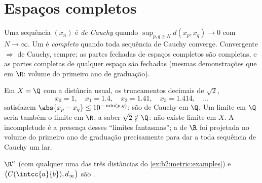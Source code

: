 \section{Espaços completos}

\begin{definition}\label{def:b2:metric:complete}
Uma sequência $(x_n)$ é \emph{de Cauchy} quando $\sup_{p, q \geq N} d(x_p,
x_q) \to 0$ com $N \to \infty$. Um  é
\emph{completo} quando toda sequência de Cauchy
converge. Convergente $\Rightarrow$ de Cauchy, sempre; as partes fechadas
de espaços completos são completas, e as partes completas de qualquer
espaço são fechadas (mesmas demonstrações que em $\R$: volume do primeiro ano de graduação).
\end{definition}

\begin{example}\label{ex:b2:metric:cauchynolimit}
Em $X = \Q$ com a distância usual, os truncamentos decimais de
$\sqrt2$,
\[
x_0 = 1,\quad x_1 = 1.4,\quad x_2 = 1.41,\quad x_3 = 1.414,
\quad\dots
\]
satisfazem $\abs{x_p - x_q} \leq 10^{-\min(p,q)}$: são de Cauchy em $\Q$.
Um limite em $\Q$ seria também o limite em $\R$, a saber
$\sqrt2 \notin \Q$: não existe limite em $X$. A incompletude é
a presença desses ``limites fantasmas''; a  de $\R$
foi projetada no volume do primeiro ano de graduação precisamente para dar a toda
sequência de Cauchy um lar.
\end{example}

\begin{theorem}\label{thm:b2:metric:rncomplete}
$\R^n$ (com qualquer uma das três distâncias do
\cref{ex:b2:metric:examples}) e $\bigl(C(\intcc{a}{b}),
d_\infty\bigr)$ são .
\end{theorem}

